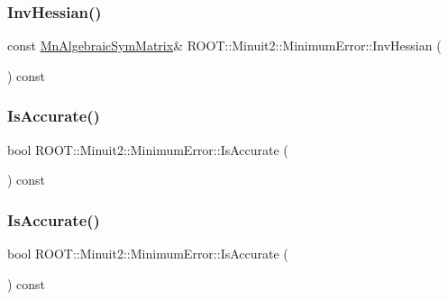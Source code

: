 \subsubsection{\texorpdfstring{InvHessian()}{InvHessian()}\hspace{0.1cm}{\footnotesize\ttfamily [3/3]}}
{\footnotesize\ttfamily const \mbox{\hyperlink{namespaceROOT_1_1Minuit2_a9e74ad97f5537a2e80e52b04d98ecc6e}{Mn\+Algebraic\+Sym\+Matrix}}\& R\+O\+O\+T\+::\+Minuit2\+::\+Minimum\+Error\+::\+Inv\+Hessian (\begin{DoxyParamCaption}{ }\end{DoxyParamCaption}) const\hspace{0.3cm}{\ttfamily [inline]}}

\mbox{\label{classROOT_1_1Minuit2_1_1MinimumError_a70c9ff6b59f2c01e5e54b4010326753d}} 
\subsubsection{\texorpdfstring{IsAccurate()}{IsAccurate()}\hspace{0.1cm}{\footnotesize\ttfamily [1/3]}}
{\footnotesize\ttfamily bool R\+O\+O\+T\+::\+Minuit2\+::\+Minimum\+Error\+::\+Is\+Accurate (\begin{DoxyParamCaption}{ }\end{DoxyParamCaption}) const\hspace{0.3cm}{\ttfamily [inline]}}

\mbox{\label{classROOT_1_1Minuit2_1_1MinimumError_a70c9ff6b59f2c01e5e54b4010326753d}} 
\subsubsection{\texorpdfstring{IsAccurate()}{IsAccurate()}\hspace{0.1cm}{\footnotesize\ttfamily [2/3]}}
{\footnotesize\ttfamily bool R\+O\+O\+T\+::\+Minuit2\+::\+Minimum\+Error\+::\+Is\+Accurate (\begin{DoxyParamCaption}{ }\end{DoxyParamCaption}) const\hspace{0.3cm}{\ttfamily [inline]}}

